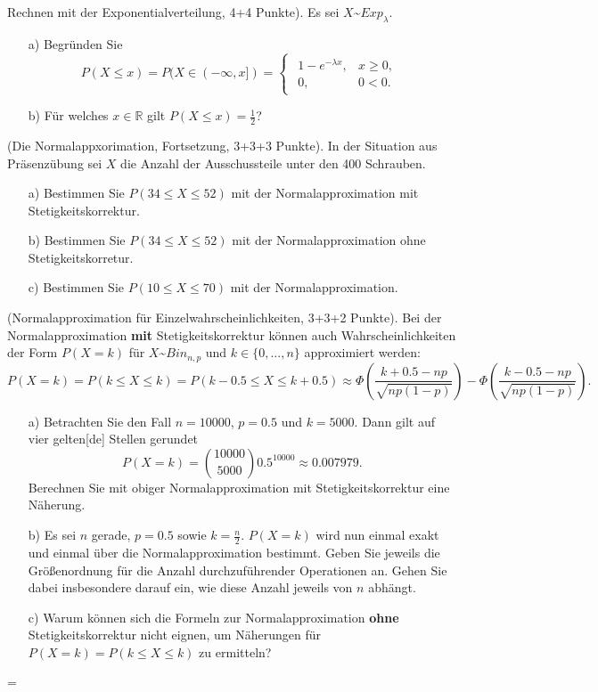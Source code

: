 \documentclass[twoside]{article}
\begin{document}
Rechnen mit der Exponentialverteilung, 4+4 Punkte).
Es sei $X$\textasciitilde$Exp_{\lambda}$.
\begin{enumerate}
		\item[a)] Begründen Sie
			\[
				P(X \leq x)=P(X \in (-\infty, x])=\begin{cases}
														\begin{array}{ll}
															1-e^{-\lambda x},	& x \geq 0,\\
															0,					& 0 < 0.
														\end{array}
													\end{cases}
			\]
		\item[b)] Für welches $x \in \mathbb{R}$ gilt $P(X \leq x) = \frac{1}{2}$?
\end{enumerate}
		
(Die Normalappxorimation, Fortsetzung, 3+3+3 Punkte).
In der Situation aus Präsenzübung sei $X$ die Anzahl der Ausschussteile unter den 400 Schrauben.
\begin{enumerate}
	\item[a)] Bestimmen Sie $P(34 \leq X \leq 52)$ mit der Normalapproximation mit Stetigkeitskorrektur.
	\item[b)] Bestimmen Sie $P(34 \leq X \leq 52)$ mit der Normalapproximation ohne Stetigkeitskorretur.
	\item[c)] Bestimmen Sie $P(10 \leq X \leq 70)$ mit der Normalapproximation.
\end{enumerate}


(Normalapproximation für Einzelwahrscheinlichkeiten, 3+3+2 Punkte).
Bei der Normalapproximation \textbf{mit} Stetigkeitskorrektur können auch Wahrscheinlichkeiten der Form $P(X=k)$ für $X$\textasciitilde$Bin_{n,p}$ und $k \in \{0,...,n\}$ approximiert werden:
\[
	P(X=k)=P(k \leq X \leq k)=P(k-0.5\leq X \leq k+0.5) \approx \Phi\left( \frac{k+0.5-np}{\sqrt{np(1-p)}} \right)-\Phi\left( \frac{k-0.5-np}{\sqrt{
	np(1-p)}} \right).
\]
\begin{enumerate}
	\item[a)] Betrachten Sie den Fall $n=10000$, $p=0.5$ und $k=5000$.
		Dann gilt auf vier gelten[de] Stellen gerundet
		\[
			P(X=k)=\binom{10000}{5000}0.5^{10000}\approx0.007979.
		\]
		Berechnen Sie mit obiger Normalapproximation mit Stetigkeitskorrektur eine Näherung.
	\item[b)] Es sei $n$ gerade, $p=0.5$ sowie $k=\frac{n}{2}$.
		$P(X=k)$ wird nun einmal exakt und einmal über die Normalapproximation bestimmt.
		Geben Sie jeweils die Größenordnung für die Anzahl durchzuführender Operationen an.
		Gehen Sie dabei insbesondere darauf ein, wie diese Anzahl jeweils von $n$ abhängt.
	\item[c)] Warum können sich die Formeln zur Normalapproximation \textbf{ohne} Stetigkeitskorrektur nicht eignen, um Näherungen für $P(X=k)=P(k \leq X \leq k)$ zu ermitteln?
\end{enumerate}
\fi
\ifnum\ZettelZwoelf=\True
{}
\fi
\end{document}
